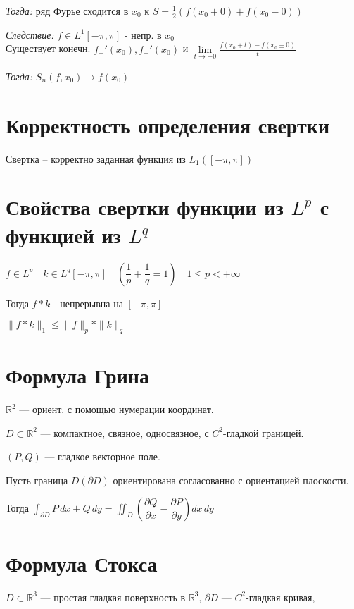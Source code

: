 \documentclass[paper=a4, fontsize=17pt]{article}
\begin{document}
\emph{Тогда:} ряд Фурье сходится в $x_0$ к $S = \frac{1}{2}(f(x_0 + 0) + f(x_0 - 0))$

\emph{Следствие:}
$f \in L^1[-\pi, \pi] $ - непр. в $x_0$\\
Существует конечн. $f_{+}'(x_0), f_{-}'(x_0)$ и $\lim\limits_{t\rightarrow \pm 0} \frac{f(x_0 + t) - f(x_0 \pm 0)}{t}$

\emph{Тогда:} $S_n(f,x_0) \rightarrow f(x_0)$
 

\section{Корректность определения свертки}
Свертка -- корректно заданная функция из $ L_1([-\pi, \pi]) $

\section{Свойства свертки функции из $L^p$ с функцией из $L^q$}


$f \in L^p \quad k \in L^q[-\pi, \pi] \quad \left(\dfrac{1}{p} + \dfrac{1}{q} = 1 \right) \quad 1 \leqslant p < +\infty$

Тогда $f * k$ - непрерывна на $[-\pi, \pi]$

$\|f * k \|_1 \leqslant \|f\|_p * \|k\|_q$

\section{Формула Грина}

$\mathbb R^2$ — ориент. с помощью нумерации координат.

$D \subset \mathbb R^2$ — компактное, связное, односвязное, с $C^2$-гладкой границей.

$(P, Q)$ — гладкое векторное поле.

Пусть граница $D (\partial D)$ ориентирована согласованно с ориентацией плоскости.

Тогда $\displaystyle\int_{\partial D} P \,dx + Q \,dy = \displaystyle\iint_D \left(\dfrac{\partial Q}{\partial x} - \dfrac{\partial P}{\partial y}\right) dx\, dy$

\section{Формула Стокса}

$D \subset \mathbb R^3$ — простая гладкая поверхность в $\mathbb R^3$,
$\partial D$ — $C^2$-гладкая кривая,
\end{document}
